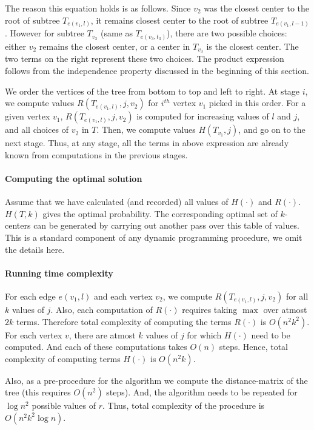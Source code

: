 \documentclass[11pt,onecolumn]{article}
\begin{document}
The reason this equation holds is as follows. 
Since $v_2$ was the closest center to the root of subtree $T_{e(v_1,l)}$, it remains closest center to the root of subtree $T_{e(v_1,l-1)}$. However for subtree $T_{v_3}$ (same as $T_{e(v_3,t_3)}$), there are two possible choices: either $v_2$ remains the closest center, or a center in $T_{v_3}$ is the closest center.  
The two terms on the right represent these two choices. The product expression follows from the independence property discussed in the beginning of this section.
 
We order the vertices of the tree from bottom to top and left to right. 
At stage $i$, we compute values $R(T_{e(v_1,l)},j,v_2)$ for $i^{th}$ vertex $v_1$ picked in this order. For a given vertex $v_1$, $R(T_{e(v_1,l)},j,v_2)$ is computed for increasing values of $l$ and $j$, and all choices of $v_2$ in $T$. Then, we compute values $H(T_{v_1},j)$, and go on to the next stage.  
Thus, at any stage, all the terms in above expression are already known from computations in the previous stages. 

\paragraph{Computing the optimal solution}
Assume that we have calculated (and recorded) all values of $H(\cdot)$ and $R(\cdot)$. $H(T,k)$ gives the optimal probability. The corresponding optimal set of $k$-centers can be generated by carrying out another pass over this table of values. This is a standard component of any dynamic programming procedure, we omit the details here. 

\paragraph{Running time complexity} For each edge $e(v_1,l)$ and each vertex $v_2$, we compute $R(T_{e(v_1,l)},j,v_2)$ for all $k$ values of $j$. 
Also, each computation of $R(\cdot)$ requires taking $\max$ over atmost $2k$ terms. Therefore total complexity of computing
the terms $R(\cdot)$ is $O(n^2k^2)$.
For each vertex $v$, there are atmost $k$ values of $j$ for which $H(\cdot)$ need to be computed. 
And each of these computations takes $O(n)$ steps. Hence, total complexity of computing terms $H(\cdot)$ is $O(n^2k)$. 

Also, as a pre-procedure for the algorithm we compute the distance-matrix of the tree (this requires $O(n^2)$ steps). And, the algorithm needs to be repeated for $\log{n^2}$ possible values of $r$. Thus, total complexity of the procedure is $O(n^2k^2\log n)$.
\end{document}
